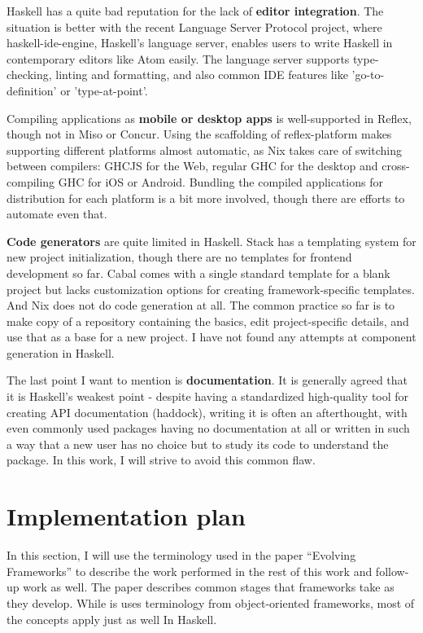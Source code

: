 \documentclass[english,odsaz]{fitthesis}
\begin{document}
Haskell has a quite bad reputation for the lack of \textbf{editor integration}. The
situation is better with the recent Language Server Protocol project, where
haskell-ide-engine, Haskell's language server, enables users to write Haskell in
contemporary editors like Atom easily. The language server supports
type-checking, linting and formatting, and also common IDE features like
'go-to-definition' or 'type-at-point'.

Compiling applications as \textbf{mobile or desktop apps} is well-supported in Reflex,
though not in Miso or Concur. Using the scaffolding of reflex-platform makes
supporting different platforms almost automatic, as Nix takes care of switching
between compilers: GHCJS for the Web, regular GHC for the desktop and
cross-compiling GHC for iOS or Android. Bundling the compiled applications for
distribution for each platform is a bit more involved, though there are efforts
to automate even that.

\textbf{Code generators} are quite limited in Haskell. Stack has a templating system for
new project initialization, though there are no templates for frontend
development so far. Cabal comes with a single standard template for a blank
project but lacks customization options for creating framework-specific
templates. And Nix does not do code generation at all. The common practice so
far is to make copy of a repository containing the basics, edit project-specific
details, and use that as a base for a new project. I have not found any attempts
at component generation in Haskell.

The last point I want to mention is \textbf{documentation}. It is generally agreed that
it is Haskell's weakest point - despite having a standardized
high-quality tool for creating API documentation (haddock), writing it is often an
afterthought, with even commonly used packages having no documentation at all or
written in such a way that a new user has no choice but to study its code to
understand the package. In this work, I will strive to avoid this common flaw.

\section{Implementation plan}
\label{sec:org5cfc59d}
In this section, I will use the terminology used in the paper ``Evolving Frameworks''
\cite{roberts1996evolving} to describe the work performed in the rest of this work
and follow-up work as well. The paper describes common stages that frameworks
take as they develop. While is uses terminology from object-oriented frameworks,
most of the concepts apply just as well In Haskell.
\end{document}
